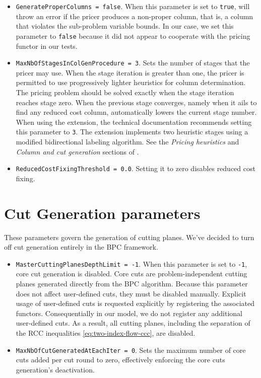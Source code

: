 \begin{itemize}
	\item \texttt{GenerateProperColumns = false}.
	      When this parameter is set to \texttt{true},
	      \bapcod{} will throw an error if the pricer produces a non-proper column,
	      that is, a column that violates the sub-problem variable bounds.
	      In our case, we set this parameter to \texttt{false}
	      because it did not appear to cooperate with the \vrpsolver{} pricing functor in our tests.
	\item \texttt{MaxNbOfStagesInColGenProcedure = 3}.
	      Sets the number of stages that the pricer may use.
	      When the stage iteration is greater than one,
	      the pricer is permitted to use progressively lighter heuristics for column determination.
	      The pricing problem should be solved exactly when the stage iteration reaches stage zero.
	      When the previous stage converges,
	      namely when it ails to find any reduced cost column,
	      \bapcod{} automatically lowers the current stage number.
	      When using the \vrpsolver{} extension,
	      the technical documentation recommends setting this parameter to \texttt{3}.
	      The \vrpsolver{} extension implements two heuristic stages using
	      a modified bidirectional labeling algorithm.
	      See the \textit{Pricing heuristics} and \textit{Column and cut generation} sections of \textcite{sadykov2021bucket}.
	\item \texttt{ReducedCostFixingThreshold = 0.0}.
	      Setting it to zero disables reduced cost fixing.
\end{itemize}

\section{Cut Generation parameters}
These parameters govern the generation of cutting planes.
We've decided to turn off cut generation entirely in the BPC framework.

\begin{itemize}
	\item \texttt{MasterCuttingPlanesDepthLimit = -1}.
	      When this parameter is set to \texttt{-1}, core cut generation is disabled.
	      Core cuts are problem-independent cutting planes generated directly from the BPC algorithm.
	      Because this parameter does not affect user-defined cuts, they must be disabled manually.
	      Explicit usage of user-defined cuts is requested explicitly
	      by registering the associated functors.
	      Consequentially in our \bapcod{} model, we do not register any additional user-defined cuts.
	      As a result, all cutting planes,
	      including the separation of the RCC inequalities \cref{eq:two-index-flow-ccc},
	      are disabled.
	\item \texttt{MaxNbOfCutGeneratedAtEachIter = 0}.
	      Sets the maximum number of core cuts added per cut round to zero,
	      effectively enforcing the core cuts generation's deactivation.
\end{itemize}

